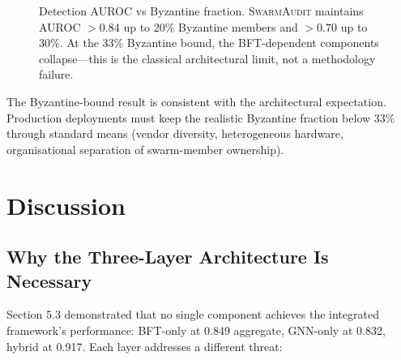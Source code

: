 \documentclass[sigconf,nonacm]{acmart}
\begin{document}
\begin{figure}[h]
\centering
{}
\caption{Detection AUROC vs Byzantine fraction.
  \textsc{SwarmAudit} maintains AUROC $> 0.84$ up to 20\% Byzantine
  members and $> 0.70$ up to 30\%. At the 33\% Byzantine bound,
  the BFT-dependent components collapse---this is the classical
  architectural limit, not a methodology failure.}
\label{fig:byzantine}
\end{figure}

The Byzantine-bound result is consistent with the architectural
expectation. Production deployments must keep the realistic
Byzantine fraction below 33\% through standard means (vendor
diversity, heterogeneous hardware, organisational separation of
swarm-member ownership).

\section{Discussion}

\subsection{Why the Three-Layer Architecture Is Necessary}

Section 5.3 demonstrated that no single component achieves
the integrated framework's performance: BFT-only at 0.849
aggregate, GNN-only at 0.832, hybrid at 0.917. Each layer addresses
a different threat:
\end{document}
